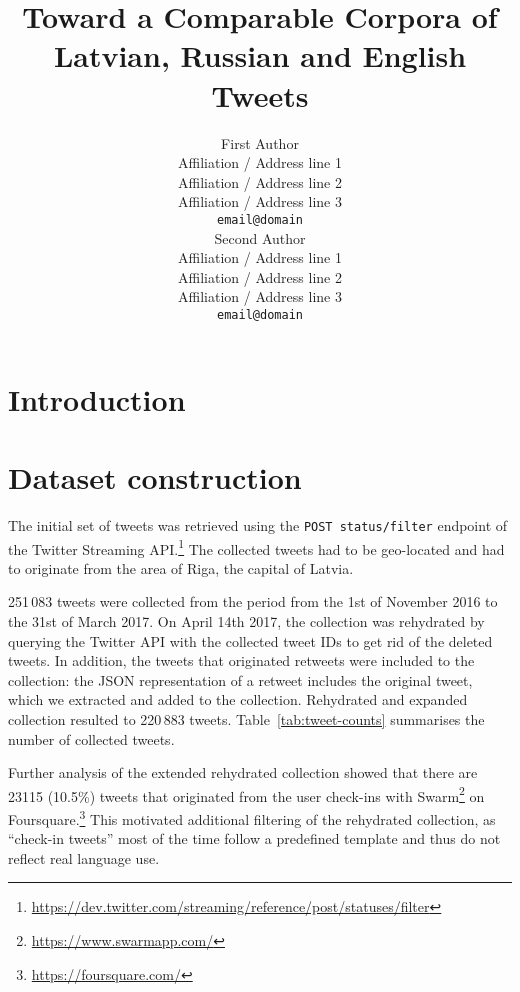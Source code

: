 \documentclass[11pt,a4paper]{article}
\title{Toward a Comparable Corpora of Latvian, Russian and English Tweets}
\author{First Author \\
  Affiliation / Address line 1 \\
  Affiliation / Address line 2 \\
  Affiliation / Address line 3 \\
  {\tt email@domain} \\\And
  Second Author \\
  Affiliation / Address line 1 \\
  Affiliation / Address line 2 \\
  Affiliation / Address line 3 \\
  {\tt email@domain} \\}
\date{}
\begin{document}
\maketitle
\begin{abstract}
\end{abstract}

\citet{milajevs-griffiths:2016:RepEval}

\section{Introduction}
\label{sec:introduction}



\section{Dataset construction}
\label{sec:construction}

The initial set of tweets was retrieved using the \texttt{POST status/filter} endpoint of the Twitter Streaming API.\footnote{\url{https://dev.twitter.com/streaming/reference/post/statuses/filter}} The collected tweets had to be geo-located and had to originate from the area of Riga, the capital of Latvia.\footnotemark{}


251\,083 tweets were collected from the period from the 1st of November 2016 to the 31st of March 2017. On April 14th 2017, the collection was rehydrated by querying the Twitter API with the collected tweet IDs to get rid of the deleted tweets. In addition, the tweets that originated retweets were included to the collection: the JSON representation of a retweet includes the original tweet, which we extracted and added to the collection. Rehydrated and expanded collection resulted to 220\,883 tweets. Table~\ref{tab:tweet-counts} summarises the number of collected tweets. 



Further analysis of the extended rehydrated collection showed that there are 23115 (10.5\%) tweets that originated from the user check-ins with Swarm\footnote{\url{https://www.swarmapp.com/}} on Foursquare.\footnote{\url{https://foursquare.com/}} This motivated additional filtering of the rehydrated collection, as ``check-in tweets'' most of the time follow a predefined template and thus do not reflect real language use. 
\end{document}
